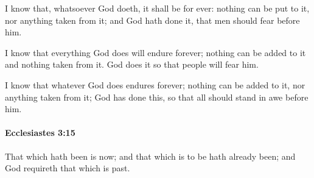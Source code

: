 			\begin{versebox}
					\item[BHS] 
					\item[LXX] 
					\item[ASV] I know that, whatsoever God doeth, it shall be for ever: nothing can be put to it, nor anything taken from it; and God hath done it, that men should fear before him.
					\item[NIV] I know that everything God does will endure forever; nothing can be added to it and nothing taken from it. God does it so that people will fear him.
					\item[NRSV] I know that whatever God does endures forever; nothing can be added to it, nor anything taken from it; God has done this, so that all should stand in awe before him.
			\end{versebox}

		\paragraph{Ecclesiastes 3:15} %
			\label{ECCLESIASTES-3-15}

			That which hath been is now; and that which is to be hath already been; and God requireth that which is past.

